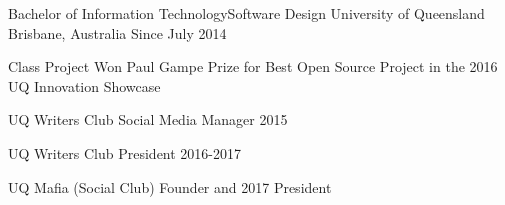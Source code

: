 


\begin{cventries}


\cventry
{Bachelor of Information Technology{\enskip\cdotp\enskip}Software Design} %
{University of Queensland} %
{Brisbane, Australia} %
{Since July 2014} %
{ %
\begin{cvitems}
\item {Class Project Won Paul Gampe Prize for Best Open Source Project in the 2016 UQ Innovation Showcase}
\item {UQ Writers Club Social Media Manager 2015}
\item {UQ Writers Club President 2016-2017}
\item {UQ Mafia (Social Club) Founder and 2017 President}
\end{cvitems}
}


\end{cventries}